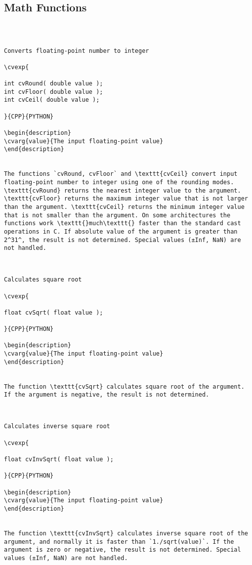 \subsection{Math Functions}
\begin{verbatim}


\end{verbatim}
\begin{verbatim}

Converts floating-point number to integer

\cvexp{

int cvRound( double value );
int cvFloor( double value );
int cvCeil( double value );

}{CPP}{PYTHON}

\begin{description}
\cvarg{value}{The input floating-point value}
\end{description}


The functions `cvRound, cvFloor` and \texttt{cvCeil} convert input floating-point number to integer using one of the rounding modes. \texttt{cvRound} returns the nearest integer value to the argument. \texttt{cvFloor} returns the maximum integer value that is not larger than the argument. \texttt{cvCeil} returns the minimum integer value that is not smaller than the argument. On some architectures the functions work \texttt{}much\texttt{} faster than the standard cast operations in C. If absolute value of the argument is greater than 2^31^, the result is not determined. Special values (±Inf, NaN) are not handled.


\end{verbatim}
\begin{verbatim}

Calculates square root

\cvexp{

float cvSqrt( float value );

}{CPP}{PYTHON}

\begin{description}
\cvarg{value}{The input floating-point value}
\end{description}


The function \texttt{cvSqrt} calculates square root of the argument. If the argument is negative, the result is not determined.


\end{verbatim}
\begin{verbatim}

Calculates inverse square root

\cvexp{

float cvInvSqrt( float value );

}{CPP}{PYTHON}

\begin{description}
\cvarg{value}{The input floating-point value}
\end{description}


The function \texttt{cvInvSqrt} calculates inverse square root of the argument, and normally it is faster than `1./sqrt(value)`. If the argument is zero or negative, the result is not determined. Special values (±Inf, NaN) are not handled.


\end{verbatim}
